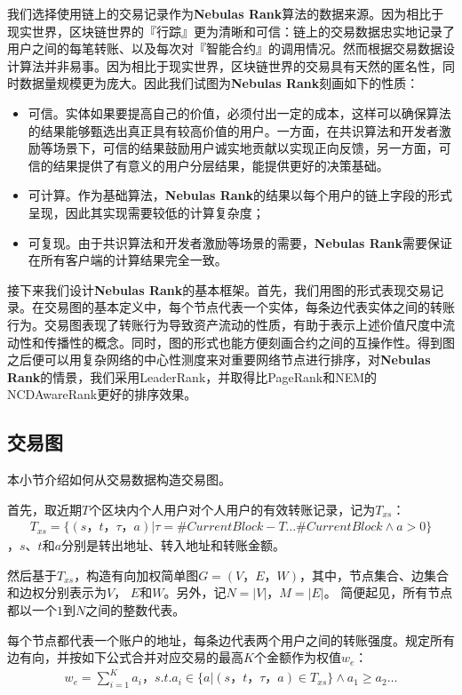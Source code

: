 我们选择使用链上的交易记录作为\textbf{Nebulas Rank}算法的数据来源。因为相比于现实世界，区块链世界的『行踪』更为清晰和可信：链上的交易数据忠实地记录了用户之间的每笔转账、以及每次对『智能合约』的调用情况。然而根据交易数据设计算法并非易事。因为相比于现实世界，区块链世界的交易具有天然的匿名性，同时数据量规模更为庞大。因此我们试图为\textbf{Nebulas Rank}刻画如下的性质：
\begin{itemize}
	\item 可信。实体如果要提高自己的价值，必须付出一定的成本，这样可以确保算法的结果能够甄选出真正具有较高价值的用户。一方面，在共识算法和开发者激励等场景下，可信的结果鼓励用户诚实地贡献以实现正向反馈，另一方面，可信的结果提供了有意义的用户分层结果，能提供更好的决策基础。
	\item 可计算。作为基础算法，\textbf{Nebulas Rank}的结果以每个用户的链上字段的形式呈现，因此其实现需要较低的计算复杂度；
	\item 可复现。由于共识算法和开发者激励等场景的需要，\textbf{Nebulas Rank}需要保证在所有客户端的计算结果完全一致。
\end{itemize}

接下来我们设计\textbf{Nebulas Rank}的基本框架。首先，我们用图的形式表现交易记录。在交易图的基本定义中，每个节点代表一个实体，每条边代表实体之间的转账行为\cite{Tschorsch2015}。交易图表现了转账行为导致资产流动的性质，有助于表示上述价值尺度中流动性和传播性的概念。同时，图的形式也能方便刻画合约之间的互操作性。得到图之后便可以用复杂网络的中心性测度来对重要网络节点进行排序，对\textbf{Nebulas Rank}的情景，我们采用LeaderRank\cite{Chen2013}\cite{Li2014}，并取得比PageRank和NEM\cite{nem}的NCDAwareRank更好的排序效果。

\subsection{交易图} \label{subsec:txg}
本小节介绍如何从交易数据构造交易图。

首先，取近期$T$个区块内个人用户对个人用户的有效转账记录，记为$T_{xs}$：
\begin{align}
T_{xs} = \{(s，t，\tau， a)| \tau = \#CurrentBlock-T \dots \#CurrentBlock \land a > 0 \}
\end{align}
，$s$、$t$和$a$分别是转出地址、转入地址和转账金额。

然后基于$T_{xs}$，构造有向加权简单图$G=(V， E， W)$，其中，节点集合、边集合和边权分别表示为$V$， $E$和$W$。另外，记$N = |V|$，$M = |E|$。 简便起见，所有节点都以一个$1$到$N$之间的整数代表。

每个节点都代表一个账户的地址，每条边代表两个用户之间的转账强度。规定所有边有向，并按如下公式合并对应交易的最高$K$个金额作为权值$w_e$：
\begin{align}\label{formula:edgeweight}
w_e = \sum_{i=1}^K a_i， s.t. a_i \in \{a|(s，t，\tau，a) \in T_{xs} \} \land a_1 \geq a_2 \dots
\end{align}


